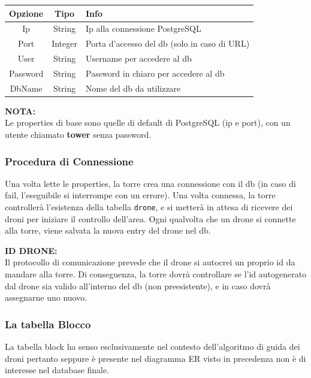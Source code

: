 \documentclass[a4paper, 11pt]{article}
\begin{document}
\begin{longtable}{|c|c|p{}|}
\hline
\textbf{Opzione} & \textbf{Tipo} & \textbf{Info} \\
\hline
Ip & String & Ip alla connessione PostgreSQL \\
\hline
Port & Integer & Porta d'accesso del db (solo in caso di URL) \\
\hline
User & String & Username per accedere al db \\
\hline
Password & String & Password in chiaro per accedere al db \\
\hline
DbName & String & Nome del db da utilizzare \\
\hline
\end{longtable}

\textbf{NOTA:} \\
Le properties di base sono quelle di default di PostgreSQL (ip e port), con un utente chiamato \textbf{tower} senza password.

\subsubsection{Procedura di Connessione}

Una volta lette le properties, la torre crea una connessione con il db (in caso di fail, l'eseguibile si interrompe con un errore).
Una volta connessa, la torre controllerà l'esistenza della tabella \texttt{drone}, e si metterà in attesa di ricevere dei droni per iniziare il controllo dell'area.
Ogni qualvolta che un drone si connette alla torre, viene salvata la nuova entry del drone nel db.

\textbf{ID DRONE:} \\
Il protocollo di comunicazione prevede che il drone si autocrei un proprio id da mandare alla torre.
Di conseguenza, la torre dovrà controllare se l'id autogenerato dal drone sia valido all'interno del db (non preesistente), e in caso dovrà assegnarne uno nuovo.
\subsubsection{La tabella Blocco}
La tabella block ha senso esclusivamente nel contesto dell'algoritmo di guida dei droni pertanto seppure è presente nel diagramma ER visto in precedenza non è di interesse nel database finale.

\newpage
\end{document}
